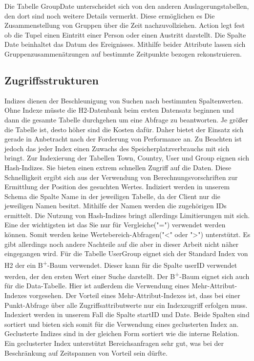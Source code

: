 Die Tabelle GroupDate unterscheidet sich von den anderen Auslagerungstabellen, den dort sind noch weitere Details vermerkt. Diese ermöglichen es Die Zusammenstellung von Gruppen über die Zeit nachzuvollziehen. Action legt fest ob die Tupel einen Eintritt einer Person oder einen Austritt darstellt. Die Spalte Date beinhaltet das Datum des Ereignisses. Mithilfe beider Attribute lassen sich Gruppenzusammenätzungen auf bestimmte Zeitpunkte bezogen rekonstruieren.

\subsection{Zugriffsstrukturen}

Indizes dienen der Beschleunigung von Suchen nach bestimmten Spaltenwerten. Ohne Indexe müsste die H2-Datenbank beim ersten Datensatz beginnen und dann die gesamte Tabelle durchgehen um eine Abfrage zu beantworten. Je größer die Tabelle ist, desto höher sind die Kosten dafür. Daher bietet der Einsatz sich gerade in Anbetracht nach der Forderung von Performance an. Zu Beachten ist jedoch das jeder Index einen Zuwachs des Speicherplatzverbrauchs mit sich bringt. Zur Indexierung der Tabellen Town, Country, User und Group eignen sich Hash-Indizes. Sie bieten einen extrem schnellen Zugriff auf die Daten. Diese Schnelligkeit ergibt sich aus der Verwendung von Berechnungsvorschriften zur Ermittlung der Position des gesuchten Wertes. Indiziert werden in unserem Schema die Spalte Name in der jeweiligen Tabelle, da der Client nur die jeweiligen Namen besitzt. Mithilfe der Namen werden die zugehörigen IDs ermittelt. Die Nutzung von Hash-Indizes bringt allerdings Limitierungen mit sich. Eine der wichtigsten ist das Sie nur für Vergleiche("=") verwendet werden können. Somit werden keine Wertebereich-Abfragen("<" oder ">") unterstützt. Es gibt allerdings noch andere Nachteile \cite{SWB-352401869} auf die aber in dieser Arbeit nicht näher eingegangen wird. 
Für die Tabelle UserGroup eignet sich der Standard Index von H2 der ein B\textsuperscript{+}-Baum verwendet. Dieser kann für die Spalte userID verwendet werden, der den ersten Wert einer Suche darstellt. Der B\textsuperscript{+}-Baum eignet sich auch für die Data-Tabelle. Hier ist außerdem die Verwendung eines Mehr-Attribut-Indexes vorgesehen. Der Vorteil eines Mehr-Attribut-Indexes ist, dass bei einer Punkt-Abfrage über alle Zugriffsattributwerte nur ein Indexzugriff erfolgen muss. Indexiert werden in unserem Fall die Spalte startID und Date. Beide Spalten sind sortiert und bieten sich somit für die Verwendung eines geclusterten Index an. Geclusterte Indizes sind in der gleichen Form sortiert wie die interne Relation. Ein geclusterter Index unterstützt Bereichsanfragen sehr gut, was bei der Beschränkung auf Zeitspannen von Vorteil sein dürfte.       


